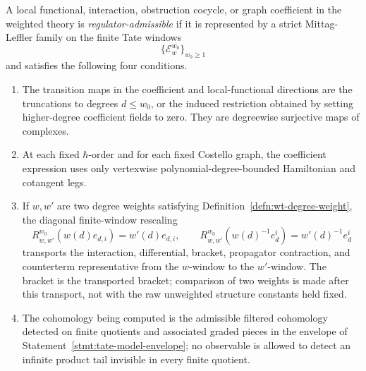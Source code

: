 \begin{defn}\label{defn:regulator-admissible-sector}
  A local functional, interaction, obstruction cocycle, or graph
  coefficient in the weighted theory is \emph{regulator-admissible} if
  it is represented by a strict Mittag-Leffler family on the finite Tate
  windows
  \[
    \{\mathcal E_w^{w_0}\}_{w_0\geq1}
  \]
  and satisfies the following four conditions.
  \begin{enumerate}[label=(A\arabic*)]
    \item The transition maps in the coefficient and local-functional
      directions are the truncations to degrees \(d\leq w_0\), or the
      induced restriction obtained by setting higher-degree coefficient
      fields to zero.  They are degreewise surjective maps of
      complexes.
    \item At each fixed \(\hbar\)-order and for each fixed Costello
      graph, the coefficient expression uses only vertexwise
      polynomial-degree-bounded Hamiltonian and cotangent legs.
    \item If \(w,w'\) are two degree weights satisfying
      Definition~\ref{defn:wt-degree-weight}, the diagonal finite-window
      rescaling
      \[
        R_{w,w'}^{w_0}(w(d)e_{d,i})=w'(d)e_{d,i},\qquad
        R_{w,w'}^{w_0}(w(d)^{-1}e^i_d)=w'(d)^{-1}e^i_d
      \]
      transports the interaction, differential, bracket, propagator
      contraction, and counterterm representative from the
      \(w\)-window to the \(w'\)-window.  The bracket is the transported
      bracket; comparison of two weights is made after this transport,
      not with the raw unweighted structure constants held fixed.
    \item The cohomology being computed is the admissible filtered
      cohomology detected on finite quotients and associated graded
      pieces in the envelope of Statement~\ref{stmt:tate-model-envelope};
      no observable is allowed to detect an infinite product tail
      invisible in every finite quotient.
  \end{enumerate}
\end{defn}

